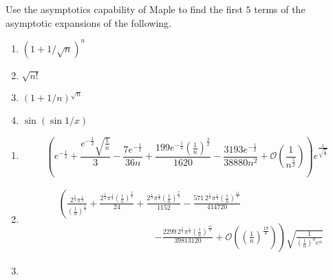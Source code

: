 \begin{exercise}
    Use the asymptotics capability of Maple to find the first $5$ terms of the asymptotic expansions of the following.
    \begin{enumerate}[label=(\alph*)]
        \item $(1+1/\sqrt{n})^n$
        \item $\sqrt{n!}$
        \item $(1+1/n)^{\sqrt{n}}$
        \item $\sin(\sin 1/x)$
    \end{enumerate}
\end{exercise}
\begin{solution}
    \begin{enumerate}[label=(\alph*)]
        \item \begin{mapleinput}
\end{mapleinput} \begin{mapleoutput}
    \[
        \left(e^{-\frac{1}{2}}+\frac{e^{-\frac{1}{2}} \sqrt{\frac{1}{n}}}{3}-\frac{7 e^{-\frac{1}{2}}}{36 n}+\frac{199 e^{-\frac{1}{2}} \left(\frac{1}{n}\right)^{\frac{3}{2}}}{1620}-\frac{3193 e^{-\frac{1}{2}}}{38880 n^{2}}+\mathcal{O}\left(\frac{1}{n^{\frac52}}\right)\right) e^{\frac{1}{\sqrt{\frac{1}{n}}}}
    \]  
\end{mapleoutput} \item \begin{mapleinput}
\end{mapleinput} \begin{mapleoutput}
    \begin{align*}
        &\left(\frac{2^{\frac{1}{4}} \pi^{\frac{1}{4}}}{\left(\frac{1}{n}\right)^{\frac{1}{4}}}+\frac{2^{\frac{1}{4}} \pi^{\frac{1}{4}} \left(\frac{1}{n}\right)^{\frac{3}{4}}}{24}+\frac{2^{\frac{1}{4}} \pi^{\frac{1}{4}} \left(\frac{1}{n}\right)^{\frac{7}{4}}}{1152}-\frac{571 \,2^{\frac{1}{4}} \pi^{\frac{1}{4}} \left(\frac{1}{n}\right)^{\frac{11}{4}}}{414720} \right. \\
        &\mspace{180mu}\left.-\frac{2299 \,2^{\frac{1}{4}} \pi^{\frac{1}{4}} \left(\frac{1}{n}\right)^{\frac{15}{4}}}{39813120}+\mathcal{O}\left(\left(\frac{1}{n}\right)^{\frac{19}{4}}\right)\right) \sqrt{\frac{1}{\left(\frac{1}{n}\right)^{n} e^{n}}}
    \end{align*}
\end{mapleoutput} \item \begin{mapleinput}

\end{mapleinput}
\end{enumerate}
\end{solution}
